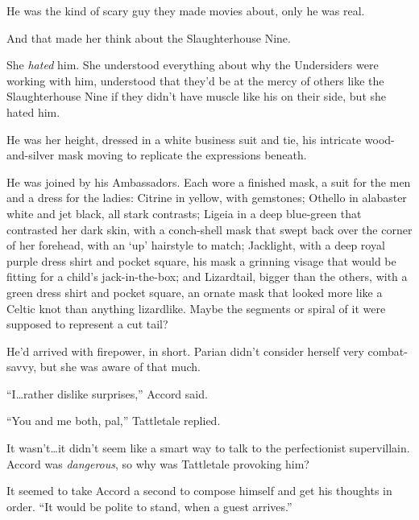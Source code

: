 He was the kind of scary guy they made movies about, only he was real.



And that made her think about the Slaughterhouse Nine.



She \emph{hated} him.  She understood everything about why the Undersiders were working with him, understood that they'd be at the mercy of others like the Slaughterhouse Nine if they didn't have muscle like his on their side, but she hated him.



He was her height, dressed in a white business suit and tie, his intricate wood-and-silver mask moving to replicate the expressions beneath.



He was joined by his Ambassadors.  Each wore a finished mask, a suit for the men and a dress for the ladies: Citrine in yellow, with gemstones; Othello in alabaster white and jet black, all stark contrasts; Ligeia in a deep blue-green that contrasted her dark skin, with a conch-shell mask that swept back over the corner of her forehead, with an `up' hairstyle to match; Jacklight, with a deep royal purple dress shirt and pocket square, his mask a grinning visage that would be fitting for a child's jack-in-the-box; and Lizardtail, bigger than the others, with a green dress shirt and pocket square, an ornate mask that looked more like a Celtic knot than anything lizardlike.  Maybe the segments or spiral of it were supposed to represent a cut tail?



He'd arrived with firepower, in short.  Parian didn't consider herself very combat-savvy, but she was aware of that much.



``I\ldots rather dislike surprises,'' Accord said.



``You and me both, pal,'' Tattletale replied.



It wasn't\ldots it didn't seem like a smart way to talk to the perfectionist supervillain.  Accord was \emph{dangerous}, so why was Tattletale provoking him?



It seemed to take Accord a second to compose himself and get his thoughts in order.  ``It would be polite to stand, when a guest arrives.''



